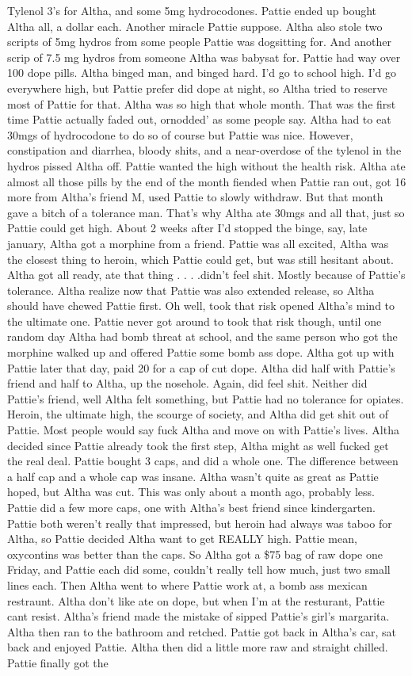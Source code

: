 \documentclass[12pt]{book}
\begin{document}
Tylenol 3's for Altha, and some 5mg hydrocodones. Pattie ended up bought Altha all, a dollar each. Another miracle Pattie suppose. Altha also stole two scripts of 5mg hydros from some people Pattie was dogsitting for. And another scrip of 7.5 mg hydros from someone Altha was babysat for. Pattie had way over 100 dope pills. Altha binged man, and binged hard. I'd go to school high. I'd go everywhere high, but Pattie prefer did dope at night, so Altha tried to reserve most of Pattie for that. Altha was so high that whole month. That was the first time Pattie actually faded out, ornodded' as some people say. Altha had to eat 30mgs of hydrocodone to do so of course but Pattie was nice. However, constipation and diarrhea, bloody shits, and a near-overdose of the tylenol in the hydros pissed Altha off. Pattie wanted the high without the health risk. Altha ate almost all those pills by the end of the month fiended when Pattie ran out, got 16 more from Altha's friend M, used Pattie to slowly withdraw. But that month gave a bitch of a tolerance man. That's why Altha ate 30mgs and all that, just so Pattie could get high. About 2 weeks after I'd stopped the binge, say, late january, Altha got a morphine from a friend. Pattie was all excited, Altha was the closest thing to heroin, which Pattie could get, but was still hesitant about. Altha got all ready, ate that thing . . .  .didn't feel shit. Mostly because of Pattie's tolerance. Altha realize now that Pattie was also extended release, so Altha should have chewed Pattie first. Oh well, took that risk opened Altha's mind to the ultimate one. Pattie never got around to took that risk though, until one random day Altha had bomb threat at school, and the same person who got the morphine walked up and offered Pattie some bomb ass dope. Altha got up with Pattie later that day, paid 20 for a cap of cut dope. Altha did half with Pattie's friend and half to Altha, up the nosehole. Again, did feel shit. Neither did Pattie's friend, well Altha felt something, but Pattie had no tolerance for opiates. Heroin, the ultimate high, the scourge of society, and Altha did get shit out of Pattie. Most people would say fuck Altha and move on with Pattie's lives. Altha decided since Pattie already took the first step, Altha might as well fucked get the real deal. Pattie bought 3 caps, and did a whole one. The difference between a half cap and a whole cap was insane. Altha wasn't quite as great as Pattie hoped, but Altha was cut. This was only about a month ago, probably less. Pattie did a few more caps, one with Altha's best friend since kindergarten. Pattie both weren't really that impressed, but heroin had always was taboo for Altha, so Pattie decided Altha want to get REALLY high. Pattie mean, oxycontins was better than the caps. So Altha got a \$75 bag of raw dope one Friday, and Pattie each did some, couldn't really tell how much, just two small lines each. Then Altha went to where Pattie work at, a bomb ass mexican restraunt. Altha don't like ate on dope, but when I'm at the resturant, Pattie cant resist. Altha's friend made the mistake of sipped Pattie's girl's margarita. Altha then ran to the bathroom and retched. Pattie got back in Altha's car, sat back and enjoyed Pattie. Altha then did a little more raw and straight chilled. Pattie finally got the 
\end{document}
